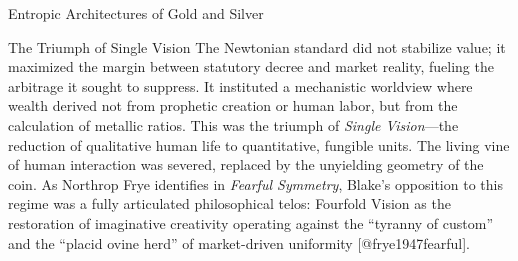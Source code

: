 \documentclass[
  ignorenonframetext,
]{beamer}
\begin{document}
\begin{frame}{Entropic Architectures of Gold and Silver}
\begin{block}{The Triumph of Single Vision}
\protect{}\label{the-triumph-of-single-vision}
The Newtonian standard did not stabilize value; it maximized the margin
between statutory decree and market reality, fueling the arbitrage it
sought to suppress. It instituted a mechanistic worldview where wealth
derived not from prophetic creation or human labor, but from the
calculation of metallic ratios. This was the triumph of \emph{Single
Vision}---the reduction of qualitative human life to quantitative,
fungible units. The living vine of human interaction was severed,
replaced by the unyielding geometry of the coin. As Northrop Frye
identifies in \emph{Fearful Symmetry}, Blake's opposition to this regime
was a fully articulated philosophical telos: Fourfold Vision as the
restoration of imaginative creativity operating against the ``tyranny of
custom'' and the ``placid ovine herd'' of market-driven uniformity
{[}@frye1947fearful{]}.
\end{block}
\end{frame}
\end{document}

